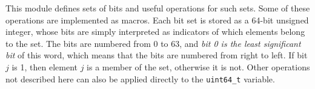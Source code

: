 
This module defines sets of bits and useful operations for such sets.
Some of these operations are implemented as macros.
Each bit set is stored as a 64-bit unsigned integer, whose bits are simply interpreted
as indicators of which elements belong to the set.
The bits are numbered from 0 to 63, and
\emph{bit 0 is the least significant bit} of this word,
which means that the bits are numbered from right to left.
%
If bit $j$ is 1, then element $j$ is a member of the set, otherwise it is not.
Other operations not described here can also be applied directly
to the \texttt{uint64\_t} variable.


